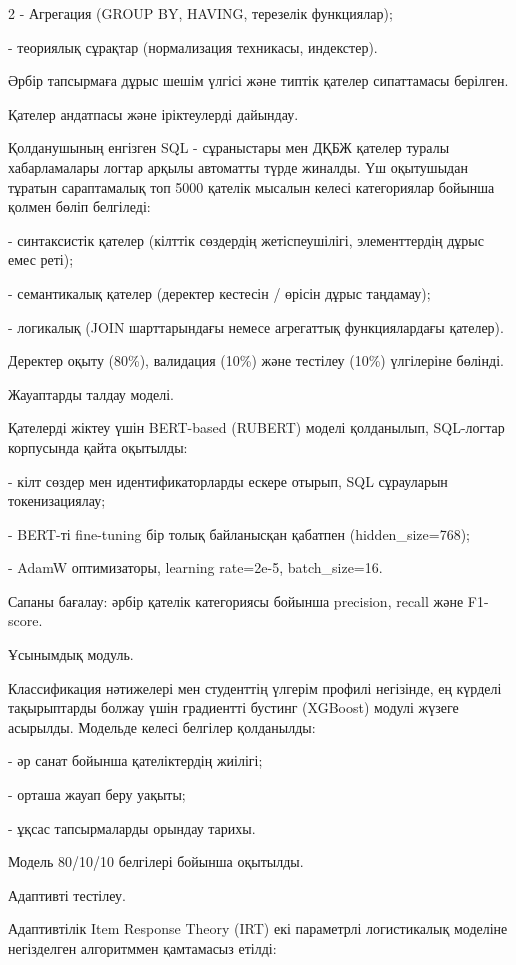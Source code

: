 \begin{multicols}{2}
- Агрегация (GROUP BY, HAVING, терезелік функциялар);

- теориялық сұрақтар (нормализация техникасы, индекстер).

Әрбір тапсырмаға дұрыс шешім үлгісі және типтік қателер сипаттамасы
берілген.

Қателер андатпасы және іріктеулерді дайындау.

Қолданушының енгізген SQL - сұраныстары мен ДҚБЖ қателер туралы
хабарламалары логтар арқылы автоматты түрде жиналды. Үш оқытушыдан
тұратын сараптамалық топ 5000 қателік мысалын келесі категориялар
бойынша қолмен бөліп белгіледі:

- синтаксистік қателер (кілттік сөздердің жетіспеушілігі, элементтердің
дұрыс емес реті);

- семантикалық қателер (деректер кестесін / өрісін дұрыс таңдамау);

- логикалық (JOIN шарттарындағы немесе агрегаттық функциялардағы
қателер).

Деректер оқыту (80\%), валидация (10\%) және тестілеу (10\%) үлгілеріне
бөлінді.

Жауаптарды талдау моделі.

Қателерді жіктеу үшін BERT-based (RUBERT) моделі қолданылып, SQL-логтар
корпусында қайта оқытылды:

- кілт сөздер мен идентификаторларды ескере отырып, SQL сұрауларын
токенизациялау;

- BERT-ті fine-tuning бір толық байланысқан қабатпен (hidden\_size=768);

- AdamW оптимизаторы, learning rate=2e-5, batch\_size=16.

Сапаны бағалау: әрбір қателік категориясы бойынша precision, recall және
F1-score.

Ұсынымдық модуль.

Классификация нәтижелері мен студенттің үлгерім профилі негізінде, ең
күрделі тақырыптарды болжау үшін градиентті бустинг (XGBoost) модулі
жүзеге асырылды. Модельде келесі белгілер қолданылды:

- әр санат бойынша қателіктердің жиілігі;

- орташа жауап беру уақыты;

- ұқсас тапсырмаларды орындау тарихы.

Модель 80/10/10 белгілері бойынша оқытылды.

Адаптивті тестілеу.

Адаптивтілік Item Response Theory (IRT) екі параметрлі логистикалық
моделіне негізделген алгоритммен қамтамасыз етілді:


\end{multicols}
